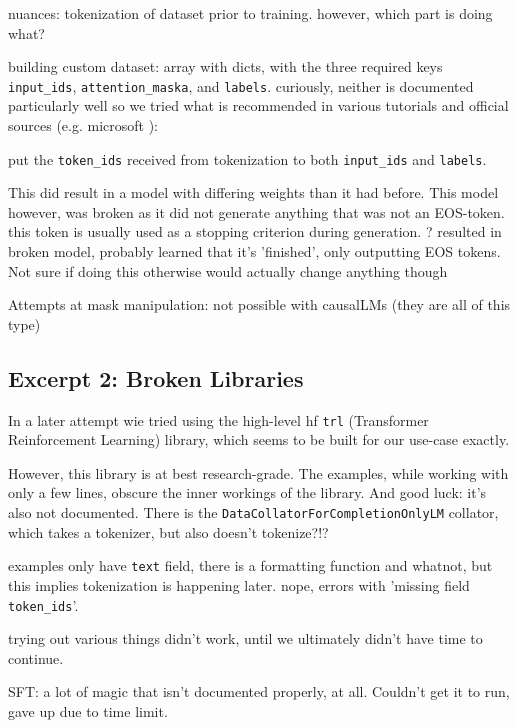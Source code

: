 nuances: tokenization of dataset prior to training. however, which part is doing what?

building custom dataset: array with dicts, with the three required keys \verb`input_ids`, \verb`attention_maska`, and \verb`labels`. curiously, neither is documented particularly well so we tried what is recommended in various tutorials and official sources (e.g. microsoft \cite{deepspeedexamples_2023}): 

put the \verb`token_ids` received from tokenization to both \verb`input_ids` and \verb`labels`.

This did result in a model with differing weights than it had before. This model however, was broken as it did not generate anything that was not an EOS-token.
this token is usually used as a stopping criterion during generation.
? resulted in broken model, probably learned that it's 'finished', only outputting EOS tokens. Not sure if doing this otherwise would actually change anything though

Attempts at mask manipulation: not possible with causalLMs (they are all of this type)

\subsection{Excerpt 2: Broken Libraries}\label{sub:libraries}
In a later attempt wie tried using the high-level \gls{hf} \verb`trl` (Transformer Reinforcement Learning) library, which seems to be built for our use-case exactly.

However, this library is at best research-grade. The examples, while working with only a few lines, obscure the inner workings of the library.
And good luck: it's also not documented. There is the \verb`DataCollatorForCompletionOnlyLM` collator, which takes a tokenizer, but also doesn't tokenize?!?

examples only have \verb`text` field, there is a formatting function and whatnot, but this implies tokenization is happening later. nope, errors with 'missing field \verb`token_ids`'.

trying out various things didn't work, until we ultimately didn't have time to continue.

SFT: a lot of magic that isn't documented properly, at all. Couldn't get it to run, gave up due to time limit.


